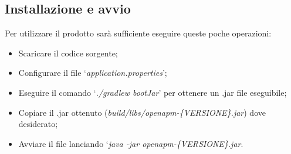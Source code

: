 	\subsection{Installazione e avvio} \label{instal}

		Per utilizzare il prodotto \ProjectName{} sarà sufficiente eseguire queste poche operazioni:
		\begin{itemize}
			\item Scaricare il codice sorgente;
			\item Configurare il file `\textit{application.properties}';
			\item Eseguire il comando `\textit{./gradlew bootJar}' per ottenere un .jar file eseguibile;
			\item Copiare il .jar ottenuto (\textit{build/libs/openapm-\{VERSIONE\}.jar}) dove desiderato;
			\item Avviare il file lanciando `\textit{java -jar openapm-\{VERSIONE\}.jar}.
		\end{itemize}
